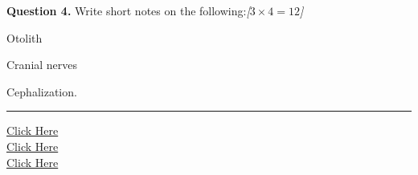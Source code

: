 \documentclass[11pt,a4paper]{article}
\newcommand{\pts}[1]{\hfill   \textit{[#1]}}
\begin{document}
\medskip


\noindent   \textbf{Question 4.} Write short notes on the following:\pts{$3  \times 4 = 12$}

\begin{parts}
  \item Otolith
  \item Cranial nerves
  \item Cephalization.
\end{parts}

\vfill
\rule{\linewidth}{0.4pt}

\begin{center}\small
\href{https://bhu-exam.vercel.app/}{Click Here}\\[4pt]\href{https://me-aryan.vercel.app/}{Click Here}\\[4pt]\href{https://quashan-me.vercel.app/}{Click Here}
\end{center}
\end{document}
